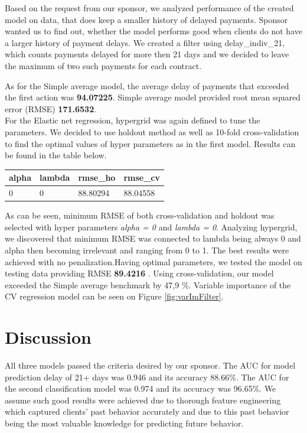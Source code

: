 \documentclass[
]{article}
\begin{document}
Based on the request from our sponsor, we analyzed performance of the created model on data, that does keep a smaller history of delayed payments. Sponsor wanted us to find out, whether the model performs good when clients do not have a larger history of payment delays. We created a filter using delay\_indiv\_21, which counts payments delayed for more then 21 days and we decided to leave the maximum of two such payments for each contract.

As for the Simple average model, the average delay of payments that exceeded the first action was \textbf{94.07225}. Simple average model provided root mean squared error (RMSE) \textbf{171.6532}.\\
For the Elastic net regression, hypergrid was again defined to tune the parameters. We decided to use holdout method as well as 10-fold cross-validation to find the optimal values of hyper parameters as in the first model. Results can be found in the table below.

\begin{longtable}[]{@{}llll@{}}
\toprule
alpha & lambda & rmse\_ho & rmse\_cv\tabularnewline
\midrule
\endhead
0 & 0 & 88.80294 & 88.04558\tabularnewline
\bottomrule
\end{longtable}

As can be seen, minimum RMSE of both cross-validation and holdout was selected with hyper parameters \emph{alpha = 0} and \emph{lambda = 0}. Analyzing hypergrid, we discovered that minimum RMSE was connected to lambda being always 0 and alpha then becoming irrelevant and ranging from 0 to 1. The best results were achieved with no penalization.Having optimal parameters, we tested the model on testing data providing RMSE \textbf{89.4216 }. Using cross-validation, our model exceeded the Simple average benchmark by 47,9 \%. Variable importance of the CV regression model can be seen on Figure \ref{fig:varImFilter}.

\hypertarget{discussion}{%
\section{Discussion}\label{discussion}}

All three models passed the criteria desired by our sponsor. The AUC for model prediction delay of 21+ days was 0.946 and its accuracy 88.66\%. The AUC for the second classification model was 0.974 and its accuracy was 96.65\%. We assume such good results were achieved due to thorough feature engineering which captured clients' past behavior accurately and due to this past behavior being the most valuable knowledge for predicting future behavior.
\end{document}
